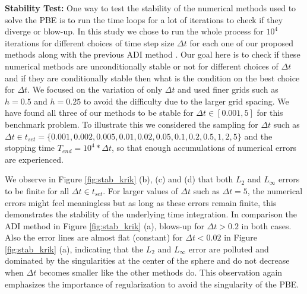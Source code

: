 \textbf{Stability Test:} One way to test the stability of the numerical methods used to solve the PBE is to run the time loops for a lot of iterations to check if they diverge or blow-up. In this study we chose to run the whole process for $10^4$ iterations for different choices of time step size $\Delta t$ for each one of our proposed  methods along with the previous ADI method \cite{Geng2013_Fully}. Our goal here is to check if these numerical methods are unconditionally stable or not for different choices of $\Delta t$ and if they are conditionally stable then what is the condition on the best choice for $\Delta t$. We focused on the variation of only $\Delta t$ and used finer grids such as $h = 0.5$ and $h = 0.25$ to avoid the difficulty due to the larger grid spacing. We have found all three of our methods to be stable for $\Delta t \in [0.001,5]$ for this benchmark problem. To illustrate this we considered the sampling for $\Delta t $ such as $\Delta t \in t_{set}=\{0.001, 0.002, 0.005,0.01, 0.02, 0.05, 0.1, 0.2, 0.5, 1,2,5\}$ and the stopping time $T_{end}= 10^4*\Delta t$, so that enough accumulations of numerical errors are experienced. 

We observe in Figure \ref{fig:stab_krik} (b), (c) and (d) that both $L_2$ and $L_\infty$ errors to be finite for all $\Delta t \in t_{set}$. For larger values of $\Delta t$ such as $\Delta t =5$, the numerical errors might feel meaningless but as long as these errors remain finite, this demonstrates the stability of the underlying time integration.  In comparison the ADI method \cite{Geng2013_Fully} in Figure \ref{fig:stab_krik} (a), blows-up for $\Delta t > 0.2$ in both cases. Also the error lines are almost flat (constant) for $\Delta t <0.02$ in Figure \ref{fig:stab_krik} (a), indicating that the $L_2$ and $L_\infty$ error are polluted and dominated by the singularities at the center of the sphere and do not decrease when $\Delta t$ becomes smaller like the other methods do. This observation again emphasizes the importance of regularization to avoid the singularity of the PBE. 


